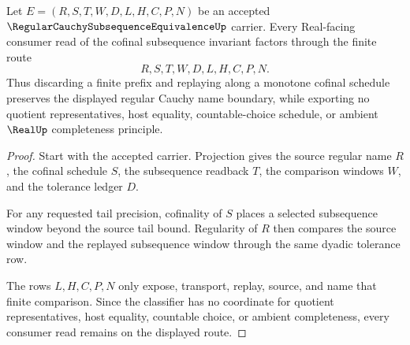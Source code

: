 \begin{theorem}
\label{thm:regular-cauchy-subsequence-equivalence-cofinal-tail-stability}
Let $E=(R,S,T,W,D,L,H,C,P,N)$ be an accepted $\RegularCauchySubsequenceEquivalenceUp$ carrier. Every Real-facing consumer read of the cofinal subsequence invariant factors through the finite route
$$
R,S,T,W,D,L,H,C,P,N.
$$
Thus discarding a finite prefix and replaying along a monotone cofinal schedule preserves the displayed regular Cauchy name boundary, while exporting no quotient representatives, host equality, countable-choice schedule, or ambient $\RealUp$ completeness principle.
\end{theorem}
\begin{proof}
Start with the accepted carrier. Projection gives the source regular name $R$, the cofinal schedule $S$, the subsequence readback $T$, the comparison windows $W$, and the tolerance ledger $D$.

For any requested tail precision, cofinality of $S$ places a selected subsequence window beyond the source tail bound. Regularity of $R$ then compares the source window and the replayed subsequence window through the same dyadic tolerance row.

The rows $L,H,C,P,N$ only expose, transport, replay, source, and name that finite comparison. Since the classifier has no coordinate for quotient representatives, host equality, countable choice, or ambient completeness, every consumer read remains on the displayed route.
\end{proof}


\begin{closurestatus}{\RegularCauchySubsequenceEquivalenceUp}
  \theoryclosure{\seedClosure}
  \formalstatus{\unformalizedV}
\end{closurestatus}

